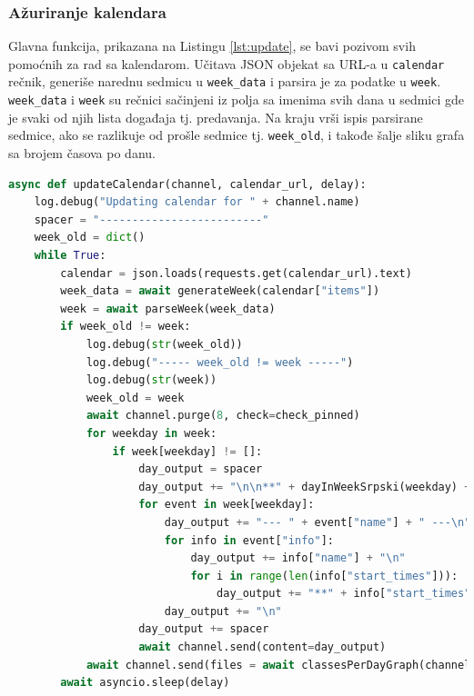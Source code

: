 \documentclass[a4paper,11pt]{article}
\begin{document}
\subsubsection{Ažuriranje kalendara}
Glavna funkcija, prikazana na Listingu \ref{lst:update}, se bavi pozivom svih pomoćnih za rad sa kalendarom. Učitava JSON objekat sa URL-a u \texttt{calendar} rečnik, generiše narednu sedmicu u \texttt{week\_data} i parsira je za podatke u \texttt{week}. \texttt{week\_data} i \texttt{week} su rečnici sačinjeni iz polja sa imenima svih dana u sedmici gde je svaki od njih lista događaja tj. predavanja. Na kraju vrši ispis parsirane sedmice, ako se razlikuje od prošle sedmice tj. \texttt{week\_old}, i takođe šalje sliku grafa sa brojem časova po danu.
\begin{lstlisting}[language=Python, caption=Ažuriranje kalendara, label=lst:update]
async def updateCalendar(channel, calendar_url, delay):
    log.debug("Updating calendar for " + channel.name)
    spacer = "-------------------------"
    week_old = dict()
    while True:
        calendar = json.loads(requests.get(calendar_url).text)
        week_data = await generateWeek(calendar["items"])
        week = await parseWeek(week_data)
        if week_old != week:
            log.debug(str(week_old))
            log.debug("----- week_old != week -----")
            log.debug(str(week))
            week_old = week
            await channel.purge(8, check=check_pinned)
            for weekday in week:
                if week[weekday] != []:
                    day_output = spacer
                    day_output += "\n\n**" + dayInWeekSrpski(weekday) + ":**\n\n"
                    for event in week[weekday]:
                        day_output += "--- " + event["name"] + " ---\n"
                        for info in event["info"]:
                            day_output += info["name"] + "\n"
                            for i in range(len(info["start_times"])):
                                day_output += "**" + info["start_times"][i] + "** - " + info["end_times"][i] + "\n"
                        day_output += "\n"
                    day_output += spacer
                    await channel.send(content=day_output)
            await channel.send(files = await classesPerDayGraph(channel.name, week))
        await asyncio.sleep(delay)
\end{lstlisting}
\newpage
\end{document}
